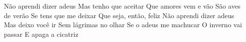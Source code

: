 \beginchorus
Não aprendi dizer adeus
Mas tenho que aceitar
Que amores vem e vão
São aves de verão
Se tens que me deixar
Que seja, então, feliz
Não aprendi dizer adeus
Mas deixo você ir
Sem lágrimas no olhar
Se o adeus me machucar
O inverno vai passar
E apaga a cicatriz
\endchorus
{}
\vspace{4em} %
\begin{comment}
\lstset{basicstyle=\scriptsize\bf} %
\tab{Solo 1}
\begin{lstlisting}
E|-----------------------------------------------------|
B|-----------------------------------------------------|
G|-----------------------------------------------------|
D|-----------------------------------------------------|
A|-----------------------------------------------------|
E|-----------------------------------------------------|
\end{lstlisting}
\end{comment}
\begin{comment}

\color{drawChord}\gtab{\color{nameChord} X}{}%
\color{drawChord}\gtab{\color{nameChord} X}{}%
\color{drawChord}\gtab{\color{nameChord} X}{}%
\color{drawChord}\gtab{\color{nameChord} X}{}%

\end{comment}
\endsong
